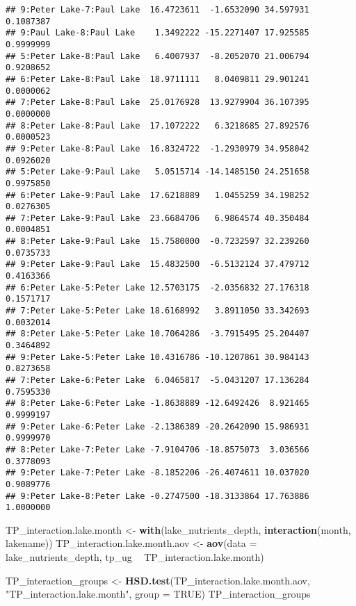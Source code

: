 \documentclass[]{article}
\newenvironment{Shaded}{\begin{snugshade}}{\end{snugshade}}
\newcommand{\DataTypeTok}[1]{\textcolor[rgb]{0.13,0.29,0.53}{#1}}
\newcommand{\KeywordTok}[1]{\textcolor[rgb]{0.13,0.29,0.53}{\textbf{#1}}}
\newcommand{\NormalTok}[1]{#1}
\newcommand{\OperatorTok}[1]{\textcolor[rgb]{0.81,0.36,0.00}{\textbf{#1}}}
\newcommand{\OtherTok}[1]{\textcolor[rgb]{0.56,0.35,0.01}{#1}}
\newcommand{\StringTok}[1]{\textcolor[rgb]{0.31,0.60,0.02}{#1}}
\begin{document}
\begin{verbatim}
## 9:Peter Lake-7:Paul Lake  16.4723611  -1.6532090 34.597931 0.1087387
## 9:Paul Lake-8:Paul Lake    1.3492222 -15.2271407 17.925585 0.9999999
## 5:Peter Lake-8:Paul Lake   6.4007937  -8.2052070 21.006794 0.9208652
## 6:Peter Lake-8:Paul Lake  18.9711111   8.0409811 29.901241 0.0000062
## 7:Peter Lake-8:Paul Lake  25.0176928  13.9279904 36.107395 0.0000000
## 8:Peter Lake-8:Paul Lake  17.1072222   6.3218685 27.892576 0.0000523
## 9:Peter Lake-8:Paul Lake  16.8324722  -1.2930979 34.958042 0.0926020
## 5:Peter Lake-9:Paul Lake   5.0515714 -14.1485150 24.251658 0.9975850
## 6:Peter Lake-9:Paul Lake  17.6218889   1.0455259 34.198252 0.0276305
## 7:Peter Lake-9:Paul Lake  23.6684706   6.9864574 40.350484 0.0004851
## 8:Peter Lake-9:Paul Lake  15.7580000  -0.7232597 32.239260 0.0735733
## 9:Peter Lake-9:Paul Lake  15.4832500  -6.5132124 37.479712 0.4163366
## 6:Peter Lake-5:Peter Lake 12.5703175  -2.0356832 27.176318 0.1571717
## 7:Peter Lake-5:Peter Lake 18.6168992   3.8911050 33.342693 0.0032014
## 8:Peter Lake-5:Peter Lake 10.7064286  -3.7915495 25.204407 0.3464892
## 9:Peter Lake-5:Peter Lake 10.4316786 -10.1207861 30.984143 0.8273658
## 7:Peter Lake-6:Peter Lake  6.0465817  -5.0431207 17.136284 0.7595330
## 8:Peter Lake-6:Peter Lake -1.8638889 -12.6492426  8.921465 0.9999197
## 9:Peter Lake-6:Peter Lake -2.1386389 -20.2642090 15.986931 0.9999970
## 8:Peter Lake-7:Peter Lake -7.9104706 -18.8575073  3.036566 0.3778093
## 9:Peter Lake-7:Peter Lake -8.1852206 -26.4074611 10.037020 0.9089776
## 9:Peter Lake-8:Peter Lake -0.2747500 -18.3133864 17.763886 1.0000000
\end{verbatim}

\begin{Shaded}
\begin{Highlighting}[]
\NormalTok{TP_interaction.lake.month <-}\StringTok{ }\KeywordTok{with}\NormalTok{(lake_nutrients_depth, }
                                  \KeywordTok{interaction}\NormalTok{(month, lakename))}
\NormalTok{TP_interaction.lake.month.aov <-}\StringTok{ }\KeywordTok{aov}\NormalTok{(}\DataTypeTok{data =}\NormalTok{ lake_nutrients_depth, }
\NormalTok{                                     tp_ug }\OperatorTok{~}\StringTok{ }\NormalTok{TP_interaction.lake.month)}

\NormalTok{TP_interaction_groups <-}\StringTok{ }\KeywordTok{HSD.test}\NormalTok{(TP_interaction.lake.month.aov, }
                                  \StringTok{"TP_interaction.lake.month"}\NormalTok{, }\DataTypeTok{group =} \OtherTok{TRUE}\NormalTok{)}
\NormalTok{TP_interaction_groups}
\end{Highlighting}
\end{Shaded}
\end{document}
